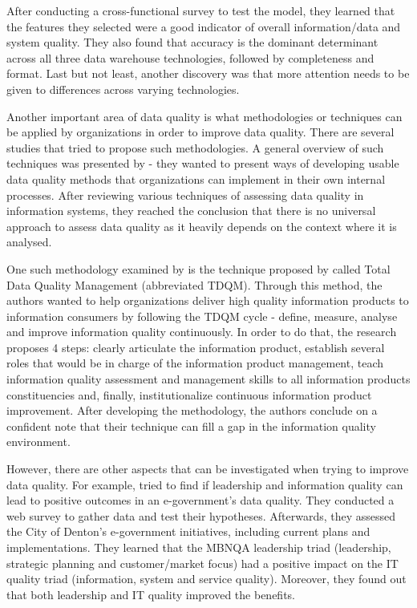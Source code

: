 \documentclass{mprop}
\begin{document}
After conducting a cross-functional survey to test the model, they learned that
the features they selected were a good indicator of overall information/data and
system quality. They also found that accuracy is the dominant determinant across
all three data warehouse technologies, followed by completeness and format. Last
but not least, another discovery was that more attention needs to be given to
differences across varying technologies.

Another important area of data quality is what methodologies or techniques can 
be applied by organizations in order to improve data quality. 
There are several studies that tried to propose such methodologies. A general 
overview of such techniques  was presented by \citet{pipino2002data} - they 
wanted to present ways of developing usable  data quality methods that 
organizations can implement in their own internal processes. After reviewing 
various techniques of assessing data quality in information systems, they reached 
the conclusion that there is no universal approach to assess data quality as it  
heavily depends on the context where it is analysed. 

One such methodology examined by \citet{pipino2002data} is the technique 
proposed by \citet{wang1998product} called Total Data Quality Management
(abbreviated TDQM). Through this method, the authors wanted to help 
organizations deliver high quality information products to information
consumers by following the TDQM cycle - define, measure, analyse and improve
information quality continuously. In order to do that, the research proposes
4 steps: clearly articulate the information product, establish several roles
that would be in charge of the information product management, teach information
quality assessment and management skills to all information products 
constituencies and, finally, institutionalize continuous information product 
improvement. After developing the methodology, the authors conclude on a 
confident note that their technique can fill a gap in the information quality
environment.

However, there are other aspects that can be investigated when trying to improve
data quality. For example, \citet{prybutok2008evaluating} tried to find if 
leadership and information quality can lead to positive outcomes in an 
e-government's data quality. They conducted a web survey to gather data and test 
their hypotheses. Afterwards, they assessed the City of Denton's e-government 
initiatives, including current plans and implementations. They learned that the 
MBNQA leadership triad (leadership, strategic planning and customer/market focus) 
had a positive impact on the IT quality triad (information, system and service 
quality). Moreover, they found out that both leadership and IT quality improved 
the benefits.
\end{document}
